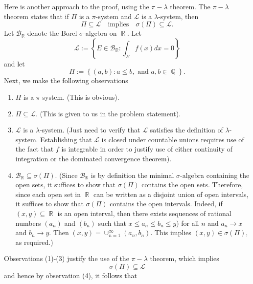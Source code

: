 \documentclass[answers]{exam}
\DeclareMathOperator{\RR}{\mathbb{R}}
\DeclareMathOperator{\QQ}{\mathbb{Q}}
\begin{document}
\begin{questions}
\begin{solution}
Here is another approach to the proof, using the $\pi-\lambda$ theorem. The
$\pi-\lambda$ theorem states that if $\Pi$ is a $\pi$-system and $\mathcal{L}$
is a $\lambda$-system, then
\begin{equation*}
  \Pi\subseteq \mathcal{L}
  \quad \text{implies} \quad
  \sigma(\Pi) \subseteq \mathcal{L}.
\end{equation*}
Let $\mathcal{B}_{\RR}$ denote the Borel $\sigma$-algebra on
$\RR$. Let
\begin{equation*}
  \mathcal{L} 
  := \left\{ E \in  \mathcal{B}_{\RR} :  \int_{E}f(x)dx  = 0 \right\}
\end{equation*}
and let 
\begin{equation*}
  \Pi := \left\{(a,b):a \leq b, \text{ and } a,b\in \QQ\right\}.
\end{equation*}
Next, we make the following observations
\begin{enumerate}
  \item $\Pi$ is a $\pi$-system. (This is obvious).
  \item $\Pi\subseteq \mathcal{L}$. (This is given to us in the problem
  statement).
  \item $\mathcal{L}$ is a $\lambda$-system. (Just need to verify that
  $\mathcal{L}$ satisfies the definition of $\lambda$-system. Establishing that
  $\mathcal{L}$ is closed under countable unions requires use of the fact that
  $f$ is integrable in order to justify use of either continuity of integration
  or the dominated convergence theorem).
  \item $  \mathcal{B}_{\RR}\subseteq \sigma(\Pi)$. (Since
  $\mathcal{B}_{\RR}$ is by definition the minimal $\sigma$-algebra
  containing the open sets, it suffices to show that $\sigma(\Pi)$ contains the
  open sets. Therefore, since each open set in $\RR$ can be written as a
  disjoint union of open intervals, it suffices to show that $\sigma(\Pi)$
  contains the open intervals. Indeed, if $(x,y)\subseteq \RR$ is an open
  interval, then there exists sequences of rational numbers $(a_{n})$ and
  $(b_{n})$ such that $x\leq a_{n}\leq b_{n}\leq y$) for all $n$ and
  $a_{n}\to x$ and $b_{n}\to y$. Then $(x,y)= \cup_{n=1}^{\infty}(a_{n},b_{n})$.
  This implies $(x,y)\in \sigma(\Pi)$, as required.)
\end{enumerate}
Observations (1)-(3) justify the use of the $\pi-\lambda$ theorem, which implies
\begin{equation*}
  \sigma(\Pi)\subseteq \mathcal{L}
\end{equation*}
and hence by observation (4), it follows that

\end{solution}
\end{questions}
\end{document}
